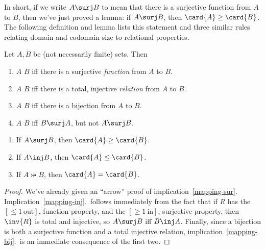 In short, if we write $A \surj B$ to mean that there is a surjective
function from $A$ to $B$, then we've just proved a lemma: if $A \surj
B$, then $\card{A} \geq \card{B}$.  The following definition and lemma
lists this statement and three similar rules relating domain and
codomain size to relational properties.

\begin{definition}\label{bigger}
  Let $A,B$ be (not necessarily finite) sets.  Then
  \begin{enumerate}
  \item $A$ \term{$\surj$} $B$ iff there is a surjective
    \emph{function} from $A$ to $B$.

  \item $A$ \term{$\inj$} $B$ iff there is a total, injective
    \emph{relation} from $A$ to $B$.

  \item $A$ \term{$\bij$} $B$ iff there is a bijection from $A$ to
    $B$.

  \item $A$ \term{$\strict$} $B$ iff $B \surj A$, but not $A \surj B$.

  \end{enumerate}
\end{definition}

\begin{lemma}\label{maprule_implies}

\begin{enumerate}

\item\label{mapping-sur} If $A \surj B$, then $\card{A} \geq
  \card{B}$.

\item\label{mapping-inj} If $A \inj B$, then $\card{A} \leq \card{B}$.

\item\label{mapping-bij} If $A \bij B$, then $\card{A} = \card{B}$.
\end{enumerate}

\end{lemma}

\begin{proof}
  We've already given an ``arrow'' proof of
  implication~\ref{mapping-sur}.
  Implication~\ref{mapping-inj}.\ follows immediately from the fact
  that if $R$ has the $[\le 1\ \text{out}]$, function property, and
  the $[\ge 1\ \text{in}]$, surjective property, then $\inv{R}$ is
  total and injective, so $A \surj B$ iff $B \inj A$.  Finally, since
  a bijection is both a surjective function and a total injective
  relation, implication~\ref{mapping-bij}.\ is an immediate
  consequence of the first two.
\end{proof}

